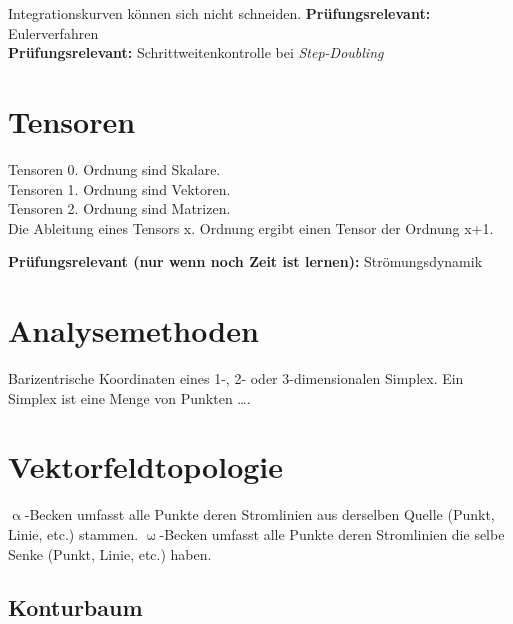 \documentclass[12pt,a4paper,oneside,normalheadings,abstracton,liststotoc,bibtotoc,titlepage,pdftex]{scrartcl}
\begin{document}
Integrationskurven können sich nicht schneiden.
\textbf{Prüfungsrelevant:} Eulerverfahren\\
\textbf{Prüfungsrelevant:} Schrittweitenkontrolle bei \textit{Step-Doubling}\\



\section{Tensoren}
Tensoren 0. Ordnung sind Skalare.\\
Tensoren 1. Ordnung sind Vektoren.\\
Tensoren 2. Ordnung sind Matrizen.\\
Die Ableitung eines Tensors x. Ordnung ergibt einen Tensor der Ordnung x+1. 

\textbf{Prüfungsrelevant (nur wenn noch Zeit ist lernen):} Strömungsdynamik\\

\section{Analysemethoden}
Barizentrische Koordinaten eines 1-, 2- oder 3-dimensionalen Simplex. Ein Simplex ist eine Menge von Punkten \dots . 



\section{Vektorfeldtopologie}
$\upalpha$-Becken umfasst alle Punkte deren Stromlinien aus derselben Quelle (Punkt, Linie, etc.) stammen. $\upomega$-Becken umfasst alle Punkte deren Stromlinien die selbe Senke (Punkt, Linie, etc.) haben.

\subsection{Konturbaum}
\end{document}
